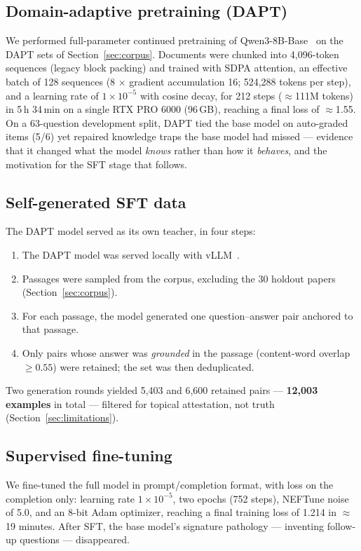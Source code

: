 \documentclass[11pt]{article}
\begin{document}
\subsection{Domain-adaptive pretraining (DAPT)}
\label{sec:dapt}

We performed full-parameter continued pretraining of
Qwen3-8B-Base~\cite{qwen3} on the DAPT sets of
Section~\ref{sec:corpus}. Documents were chunked into 4,096-token
sequences (legacy block packing) and trained with SDPA attention, an
effective batch of 128 sequences (8 $\times$ gradient accumulation 16;
524,288 tokens per step), and a learning rate of $1\times10^{-5}$ with
cosine decay, for 212 steps ($\approx$111M tokens) in 5\,h 34\,min on a
single RTX PRO 6000 (96\,GB), reaching a final loss of $\approx$1.55.
On a 63-question development split, DAPT tied the base model on
auto-graded items (5/6) yet repaired knowledge traps the base model had
missed --- evidence that it changed what the model \emph{knows} rather
than how it \emph{behaves}, and the motivation for the SFT stage that
follows.

\subsection{Self-generated SFT data}
\label{sec:sft-data}

The DAPT model served as its own teacher, in four steps:
\begin{enumerate}
\item The DAPT model was served locally with vLLM~\cite{vllm}.
\item Passages were sampled from the corpus, excluding the 30 holdout
papers (Section~\ref{sec:corpus}).
\item For each passage, the model generated one question--answer pair
anchored to that passage.
\item Only pairs whose answer was \emph{grounded} in the passage
(content-word overlap $\geq 0.55$) were retained; the set was then
deduplicated.
\end{enumerate}
Two generation rounds yielded 5,403 and 6,600 retained pairs ---
\textbf{12,003 examples} in total --- filtered for topical
attestation, not truth (Section~\ref{sec:limitations}).

\subsection{Supervised fine-tuning}
\label{sec:sft-train}

We fine-tuned the full model in prompt/completion format, with loss on
the completion only: learning rate $1\times10^{-5}$, two epochs (752
steps), NEFTune noise~\cite{neftune} of 5.0, and an 8-bit Adam
optimizer, reaching a final training loss of 1.214 in $\approx$19
minutes. After SFT, the base model's signature pathology ---
inventing follow-up questions --- disappeared.
\end{document}
